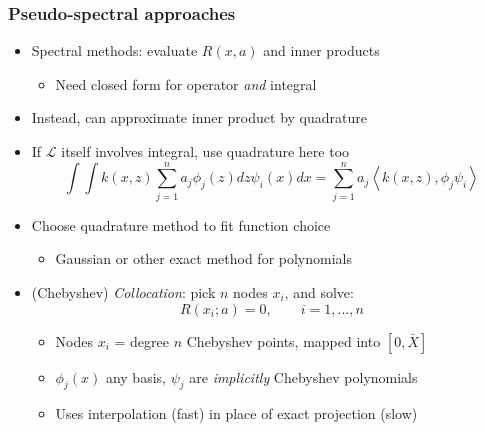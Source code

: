 \documentclass[bigger,handout]{beamer}
\begin{document}
\begin{frame}%
  
\frametitle{Pseudo-spectral approaches}

\begin{itemize}

\item Spectral methods: evaluate $R(x,a)$ and inner products
\begin{itemize}
\item Need closed form for operator \emph{and} integral
\end{itemize}
\item Instead, can approximate inner product by quadrature
\item If $\mathcal{L}$ itself involves integral, use quadrature here too
\begin{equation*}
\int\int k(x,z)\sum_{j=1}^{n}a_{j}\phi_{j}(z)dz\psi_{i}(x)dx=\sum_{j=1}^{n}a_{j}\left\langle k(x,z),\phi_{j}\psi_{i}\right\rangle
\end{equation*}

\item Choose quadrature method to fit function choice
\begin{itemize}
\item Gaussian or other exact method for polynomials
\end{itemize}

\item (Chebyshev) \emph{Collocation}: pick $n$ nodes $x_{i}$, and solve:%
\begin{equation*}
R\left( x_{i};a\right) =0,\qquad i=1,...,n
\end{equation*}

\begin{itemize}
\item Nodes $x_{i}$ = degree $n$ Chebyshev points, mapped into $\left[ 0,\bar{X}\right] $
\item $\phi _{j}\left( x\right) $ any basis, $\psi_j$ are \emph{implicitly} Chebyshev polynomials
\item Uses interpolation (fast) in place of exact projection (slow)
\end{itemize}

\end{itemize}
 
\end{frame}%
 
\end{document}
